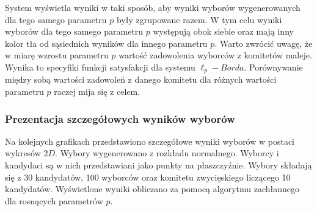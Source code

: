 \documentclass[polish,11pt]{aghthesis}
\begin{document}
System wyświetla wyniki w taki sposób, aby wyniki wyborów wygenerowanych dla tego samego parametru $p$ były zgrupowane razem. W tym celu wyniki wyborów dla tego samego parametru $p$ występują obok siebie oraz mają inny kolor tła od sąsiednich wyników dla innego parametru $p$. Warto zwrócić uwagę, że w miarę wzrostu parametru $p$ wartość zadowolenia wyborców z komitetów maleje. Wynika to specyfiki funkcji satysfakcji dla systemu $\ell_p-Borda$. Porównywanie między sobą wartości zadowoleń z danego komitetu dla różnych wartości parametru $p$ raczej mija się z celem.  

\subsubsection{Prezentacja szczegółowych wyników wyborów}
Na kolejnych grafikach przedstawiono szczegółowe wyniki wyborów w postaci wykresów $2D$. Wybory wygenerowano z rozkładu
normalnego. Wyborcy i kandydaci są w nich przedstawiani jako punkty na płaszczyźnie. Wybory składają się z 30 kandydatów, 100 wyborców oraz komitetu
zwycięskiego liczącego 10 kandydatów. Wyświetlone wyniki obliczano za pomocą algorytmu
zachłannego dla rosnących parametrów $p$.
\end{document}
